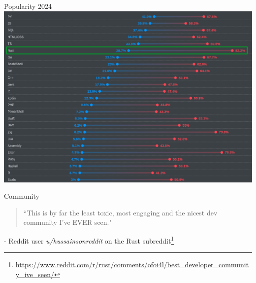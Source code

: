 \documentclass{beamer}
\begin{document}
\begin{frame}{Popularity 2024} 
\includegraphics[scale=0.35]{desired-admired-2024}
\end{frame} 


\begin{frame}{Community} 
\begin{block}{}
\begin{quote}
``This is by far the least toxic, most engaging and the nicest dev community I've EVER seen."
\end{quote}
\end{block}
- Reddit user \emph{u/hussainsonreddit} on the Rust subreddit\footnote{\url{https://www.reddit.com/r/rust/comments/ofoi4l/best_developer_community_ive_seen/}}
\end{frame}
\end{document}
